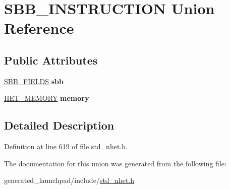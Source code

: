 \hypertarget{unionSBB__INSTRUCTION}{}\section{S\+B\+B\+\_\+\+I\+N\+S\+T\+R\+U\+C\+T\+I\+ON Union Reference}
\label{unionSBB__INSTRUCTION}
\subsection*{Public Attributes}
\begin{DoxyCompactItemize}
\item 
\mbox{\label{unionSBB__INSTRUCTION_af57d2f4f99938716305ae7c792f27df9}} 
\mbox{\hyperlink{structSBB__format}{S\+B\+B\+\_\+\+F\+I\+E\+L\+DS}} {\bfseries sbb}
\item 
\mbox{\label{unionSBB__INSTRUCTION_ae708f957d02b1bd8f12e2637d3628d82}} 
\mbox{\hyperlink{structmemory__format}{H\+E\+T\+\_\+\+M\+E\+M\+O\+RY}} {\bfseries memory}
\end{DoxyCompactItemize}


\subsection{Detailed Description}


Definition at line 619 of file std\+\_\+nhet.\+h.



The documentation for this union was generated from the following file\+:\begin{DoxyCompactItemize}
\item 
generated\+\_\+launchpad/include/\mbox{\hyperlink{std__nhet_8h}{std\+\_\+nhet.\+h}}\end{DoxyCompactItemize}
